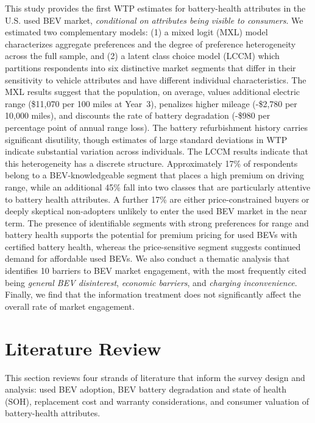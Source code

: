 \documentclass[a4paper,fleqn]{cas-sc}   %
\begin{document}
This study provides the first WTP estimates for battery-health attributes in the U.S. used BEV market, \textit{conditional on attributes being visible to consumers}. We estimated two complementary models: (1) a mixed logit (MXL) model characterizes aggregate preferences and the degree of preference heterogeneity across the full sample, and (2) a latent class choice model (LCCM) which partitions respondents into six distinctive market segments that differ in their sensitivity to vehicle attributes and have different individual characteristics. The MXL results suggest that the population, on average, values additional electric range (\$11,070 per 100 miles at Year~3), penalizes higher mileage (-\$2,780 per 10,000 miles), and discounts the rate of battery degradation (-\$980 per percentage point of annual range loss). The battery refurbishment history carries significant disutility, though estimates of large standard deviations in WTP indicate substantial variation across individuals. The LCCM results indicate that this heterogeneity has a discrete structure. Approximately 17\% of respondents belong to a BEV-knowledgeable segment that places a high premium on driving range, while an additional 45\% fall into two classes that are particularly attentive to battery health attributes.  A further 17\% are either price-constrained buyers or deeply skeptical non-adopters unlikely to enter the used BEV market in the near term. The presence of identifiable segments with strong preferences for range and battery health supports the potential for premium pricing for used BEVs with certified battery health, whereas the price-sensitive segment suggests continued demand for affordable used BEVs. We also conduct a thematic analysis that identifies 10 barriers to BEV market engagement, with the most frequently cited being \textit{general BEV disinterest}, \textit{economic barriers}, and \textit{charging inconvenience}. Finally, we find that the information treatment does not significantly affect the overall rate of market engagement.





\section{Literature Review}
\label{section:lit_review}
This section reviews four strands of literature that inform the survey design and analysis: used BEV adoption, BEV battery degradation and state of health (SOH), replacement cost and warranty considerations, and consumer valuation of battery-health attributes. 
\end{document}
